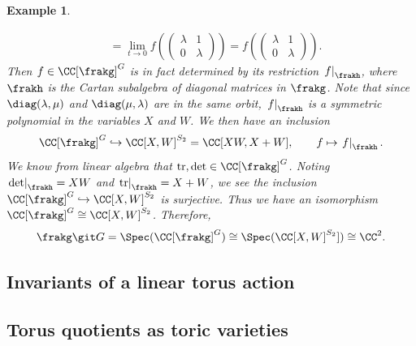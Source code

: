 \documentclass[12pt]{amsart}
\theoremstyle{plain}
\newtheorem{example}[theorem]{Example}
\begin{document}
\begin{example}
\begin{enumerate}
\begin{align*}
&= \lim_{t \to 0} f\left( \begin{pmatrix} \lambda & 1 \\ 0 & \lambda \end{pmatrix} \right) 
= f\left( \begin{pmatrix} \lambda & 1 \\ 0 & \lambda \end{pmatrix} \right).
\end{align*}
Then $f \in \CC[\frakg]^G$ is in fact determined by its restriction $\left. f \right|_{\frakh}$, where $\frakh$ is the Cartan subalgebra of diagonal matrices in $\frakg$.
Note that since $\diag(\lambda, \mu)$ and $\diag(\mu, \lambda)$ are in the same orbit, $\left. f \right|_\frakh$ is a symmetric polynomial in the variables $X$ and $W$.
We then have an inclusion
$$\CC[\frakg]^G \hookrightarrow \CC[X, W]^{S_2} = \CC[XW, X+W], \qquad f \mapsto \left. f \right|_\frakh.$$
We know from linear algebra that $\mathrm{tr}, \mathrm{det} \in \CC[\frakg]^G$.
Noting $\left. \mathrm{det} \right|_\frakh = XW$ and $\left. \mathrm{tr} \right|_\frakh = X+W$, we see the inclusion $\CC[\frakg]^G \hookrightarrow \CC[X, W]^{S_2}$ is surjective.
Thus we have an isomorphism $\CC[\frakg]^G \cong \CC[X, W]^{S_2}$.
Therefore,
$$\frakg \git G = \Spec(\CC[\frakg]^G) \cong \Spec(\CC[X, W]^{S_2}]) \cong \CC^2.$$
\end{enumerate}
\end{example}





\subsection{Invariants of a linear torus action}





\subsection{Torus quotients as toric varieties}
\end{document}

